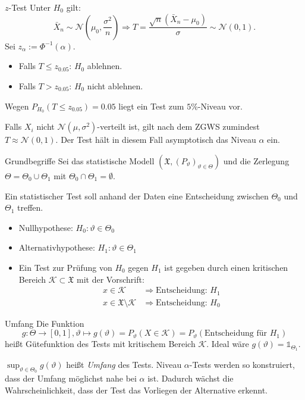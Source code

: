 \begin{karte}{\(z\)-Test}
Unter \(H_0\) gilt: 
\[ \bar{X}_n \sim \mathcal{N}\left(\mu_0, \frac{\sigma^2}{n}\right) \Rightarrow T = \frac{\sqrt{n}(\bar{X}_n - \mu_0)}{\sigma} \sim \mathcal{N}(0,1). \]
Sei \(z_\alpha := \Phi^{-1}(\alpha)\).

\begin{itemize}
    \item Falls \(T \leq z_{0.05}\): \(H_0\) ablehnen.
    \item Falls \(T > z_{0.05}\): \(H_0\) nicht ablehnen.
\end{itemize}
Wegen \(P_{H_0}(T \leq z_{0.05}) = 0.05\) liegt ein Test zum \(5\%\)-Niveau vor.

Falls \(X_i\) nicht \(\mathcal{N}(\mu, \sigma^2)\)-verteilt ist, gilt nach dem ZGWS zumindest \(T \approx \mathcal{N}(0,1)\).
Der Test hält in diesem Fall asymptotisch das Niveau \(\alpha\) ein.
\end{karte}

\begin{karte}{Grundbegriffe}
Sei das statistische Modell \((\mathfrak{X}, (P_\vartheta)_{\vartheta\in \Theta})\) 
und die Zerlegung \(\Theta = \Theta_0 \cup \Theta_1\) mit \(\Theta_0 \cap \Theta_1 = \emptyset\).

Ein statistischer Test soll anhand der Daten eine Entscheidung zwischen \(\Theta_0\) und \(\Theta_1\) treffen.
\begin{itemize}
    \item Nullhypothese: \(H_0: \vartheta \in \Theta_0\)
    \item Alternativhypothese: \(H_1: \vartheta \in \Theta_1\)
    \item Ein Test zur Prüfung von \(H_0\) gegen \(H_1\) ist gegeben durch einen kritischen Bereich \(\mathcal{K} \subset \mathfrak{X}\) mit der Vorschrift: 
    \begin{align*}
        x \in \mathcal{K} &\Rightarrow \text{Entscheidung: } H_1 \\
        x \in \mathfrak{X}\setminus \mathcal{K} &\Rightarrow \text{Entscheidung: } H_0
    \end{align*}
\end{itemize}
\end{karte}

\begin{karte}{Umfang}
Die Funktion 
\[ g: \Theta \rightarrow [0,1], \vartheta \mapsto g(\vartheta) = P_\vartheta(X \in \mathcal{K}) = P_\vartheta(\text{Entscheidung für }H_1) \]
heißt Gütefunktion des Tests mit kritischem Bereich \(\mathcal{K}\).
Ideal wäre \(g(\vartheta) = \mathds{1}_{\Theta_1}\).

\(\sup_{\vartheta \in \Theta_0} g(\vartheta)\) heißt \textit{Umfang} des Tests.
Niveau \(\alpha\)-Tests werden so konstruiert, dass der Umfang möglichst nahe bei \(\alpha\) ist. 
Dadurch wächst die Wahrscheinlichkeit, dass der Test das Vorliegen der Alternative erkennt.
\end{karte}

